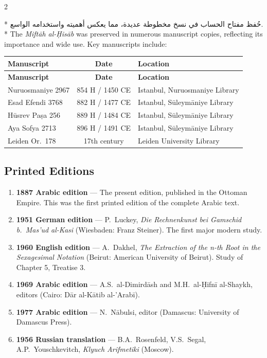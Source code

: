 \documentclass[11pt,a4paper]{article}
\newcommand{\ar}[1]{{\arabicfont\beginR #1\endR}}
\newenvironment{bilingual}{%
  \vspace{0.3em}%
  \begin{paracol}{2}%
}{%
  \end{paracol}%
  \vspace{0.3em}%
}
\begin{document}
\begin{bilingual}
\switchcolumn[0]*
\ar{حُفظ مفتاح الحساب في نسخ مخطوطة عديدة، مما يعكس أهميته واستخدامه الواسع.}
\switchcolumn[1]*
The \textit{Mift\=ah al-\d{H}is\=ab} was preserved in numerous manuscript
copies, reflecting its importance and wide use. Key manuscripts
include:
\end{bilingual}

\begin{longtable}{|l|c|l|}
\hline
\textbf{Manuscript} & \textbf{Date} & \textbf{Location} \\
\hline
\endfirsthead
\hline
\textbf{Manuscript} & \textbf{Date} & \textbf{Location} \\
\hline
\endhead
Nuruosmaniye 2967 & 854 H / 1450 CE & Istanbul, Nuruosmaniye Library
\\
\hline
Esad Efendi 3768 & 882 H / 1477 CE & Istanbul, S\=uleym\=aniye Library \\
\hline
H\=usrev Pa\d{s}a 256 & 889 H / 1484 CE & Istanbul, S\=uleym\=aniye Library \\
\hline
Aya Sofya 2713 & 896 H / 1491 CE & Istanbul, S\=uleym\=aniye Library \\
\hline
Leiden Or.\ 178 & 17th century & Leiden University Library \\
\hline
\end{longtable}

\subsection{Printed Editions}

\begin{enumerate}[label=\arabic*.]
  \item \textbf{1887 Arabic edition} --- The present edition, published in
  the Ottoman Empire. This was the first printed edition of the
  complete Arabic text.
  \item \textbf{1951 German edition} --- P.\ Luckey, \textit{Die
  Rechnenkunst bei Gamschid b.\ Mas'ud al-Kasi} (Wiesbaden: Franz
  Steiner). The first major modern study.
  \item \textbf{1960 English edition} --- A.\ Dakhel, \textit{The Extraction
  of the n-th Root in the Sexagesimal Notation} (Beirut: American
  University of Beirut). Study of Chapter 5, Treatise 3.
  \item \textbf{1969 Arabic edition} --- A.S.\ al-Dimird\=ash and
  M.H.\ al-\d{H}ifn\=i al-Shaykh, editors (Cairo: D\=ar al-K\=atib al-'Arab\=i).
  \item \textbf{1977 Arabic edition} --- N.\ N\=abulsi, editor (Damascus:
  University of Damascus Press).
  \item \textbf{1956 Russian translation} --- B.A.\ Rosenfeld, V.S.\ Segal,
  A.P.\ Youschkevitch, \textit{Klyuch Arifmetiki} (Moscow).
\end{enumerate}
\end{document}
